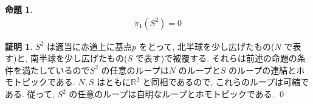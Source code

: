 \documentclass[10pt, fleqn, label-section=none]{bxjsarticle}
\theoremstyle{definition}
\newtheorem{prop}[dfn]{命題}
\newtheorem*{pf*}{証明}
\renewcommand{\;}{\, ; \,}
\begin{document}
\begin{prop}
\begin{align*} \pi_1 (S^2) = 0 \end{align*}
\end{prop}
\begin{pf*}
$S^2$ は適当に赤道上に基点$p$ をとって, 北半球を少し広げたもの($N$ で表す)と, 南半球を少し広げたもの($S$ で表す)で被覆する. それらは前述の命題の条件を満たしているので$S^2$ の任意のループは$N$ のループと$S$ のループの連結とホモトピックである. $N, S$ はともに$\mathbb R^2$ と同相であるので, これらのループは可縮である. 従って, $S^2$ の任意のループは自明なループとホモトピックである. 
\qed
\end{pf*}
\end{document}
